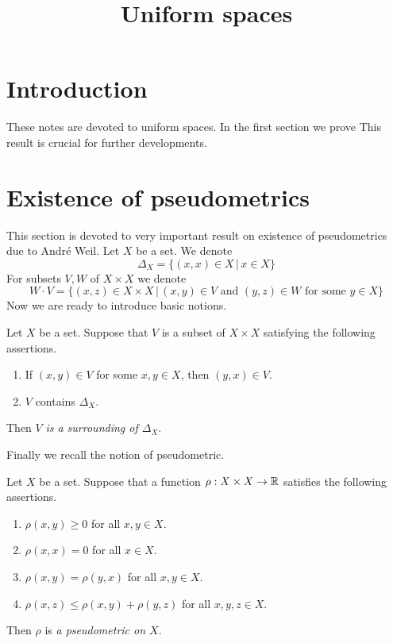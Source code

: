 



\title{Uniform spaces}
\date{}
\maketitle

\section{Introduction}
\noindent
These notes are devoted to uniform spaces. In the first section we prove  This result is crucial for further developments.

\section{Existence of pseudometrics}
\noindent
This section is devoted to very important result on existence of pseudometrics due to Andr{\'e} Weil. Let $X$ be a set. We denote 
$$\Delta_X = \big\{(x,x)\in X\,\big|\,x\in X\big\}$$
For subsets $V,W$ of $X\times X$ we denote
$$W\cdot V = \big\{(x,z)\in X\times X\,\big|\,(x,y)\in V\mbox{ and }(y,z)\in W\mbox{ for some }y\in X\big\}$$
Now we are ready to introduce basic notions.

\begin{definition}
Let $X$ be a set. Suppose that $V$ is a subset of $X\times X$ satisfying the following assertions.
\begin{enumerate}[label=\textbf{(\arabic*)}, leftmargin=*]
\item If $(x,y)\in V$ for some $x,y\in X$, then $(y,x)\in V$.
\item $V$ contains $\Delta_X$.
\end{enumerate}
Then $V$ \textit{is a surrounding of $\Delta_X$}.
\end{definition}
\noindent
Finally we recall the notion of pseudometric.

\begin{definition}
Let $X$ be a set. Suppose that a function $\rho:X\times X\rightarrow {\mathbb R}$ satisfies the following assertions.
\begin{enumerate}[label=\textbf{(\arabic*)}, leftmargin=*]
\item $\rho(x,y) \geq 0$ for all $x,y\in X$.
\item $\rho(x,x) = 0$ for all $x\in X$.
\item $\rho(x,y) = \rho(y,x)$ for all $x,y\in X$.
\item $\rho(x,z)\leq \rho(x,y) + \rho(y,z)$ for all $x,y,z\in X$.
\end{enumerate}
Then $\rho$ is \textit{a pseudometric on $X$}.
\end{definition}

